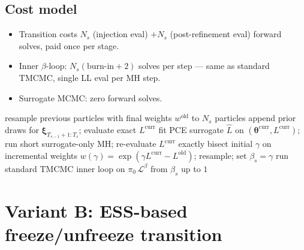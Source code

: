 \documentclass[11pt,a4paper]{article}
\newcommand{\bxi}{\boldsymbol{\xi}}          %
\newcommand{\bth}{\boldsymbol{\theta}}        %
\newcommand{\bL}{\mathcal{L}}                 %
\newcommand{\bpi}{\pi}                        %
\newcommand{\Ntot}{N}
\begin{document}
\subsection{Cost model}
\begin{itemize}
  \item Transition costs $\Ntot_s$ (injection eval) $+ \Ntot_s$ (post-refinement eval) forward solves, paid once per stage.
  \item Inner $\beta$-loop: $\Ntot_s(\text{burn-in}+2)$ solves per step --- same as standard TMCMC, single LL eval per MH step.
  \item Surrogate MCMC: zero forward solves.
\end{itemize}

\begin{algorithm}[ht]
\caption{SequentialTMCMC with \texttt{SurrogateTransition} (stage $s \ge 2$ transition)}
\begin{algorithmic}[1]
\State resample previous particles with final weights $w^{\mathrm{old}}$ to $\Ntot_s$ particles
\State append prior draws for $\bxi_{T_{s-1}+1:T_s}$; evaluate exact $L^{\mathrm{curr}}$
\State fit PCE surrogate $\hat L$ on $(\bth^{\mathrm{curr}}, L^{\mathrm{curr}})$; run short surrogate-only MH; re-evaluate $L^{\mathrm{curr}}$ exactly
\State bisect initial $\gamma$ on incremental weights $w(\gamma) = \exp(\gamma L^{\mathrm{curr}} - L^{\mathrm{old}})$; resample; set $\beta_s = \gamma$
\State run standard TMCMC inner loop on $\bpi_0\,\bL^{\beta}$ from $\beta_s$ up to $1$
\end{algorithmic}
\end{algorithm}

\section{Variant B: ESS-based freeze/unfreeze transition}
\end{document}
